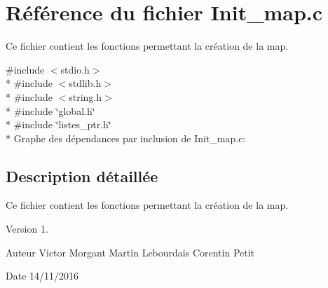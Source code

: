 \hypertarget{a00022}{}\section{Référence du fichier Init\+\_\+map.\+c}
\label{a00022}


Ce fichier contient les fonctions permettant la création de la map.  


{\ttfamily \#include $<$stdio.\+h$>$}\\*
{\ttfamily \#include $<$stdlib.\+h$>$}\\*
{\ttfamily \#include $<$string.\+h$>$}\\*
{\ttfamily \#include \char`\"{}global.\+h\char`\"{}}\\*
{\ttfamily \#include \char`\"{}listes\+\_\+ptr.\+h\char`\"{}}\\*
Graphe des dépendances par inclusion de Init\+\_\+map.\+c\+:


\subsection{Description détaillée}
Ce fichier contient les fonctions permettant la création de la map. 

\begin{DoxyVersion}{Version}
1. 
\end{DoxyVersion}
\begin{DoxyAuthor}{Auteur}
Victor Morgant Martin Lebourdais Corentin Petit 
\end{DoxyAuthor}
\begin{DoxyDate}{Date}
14/11/2016 
\end{DoxyDate}
